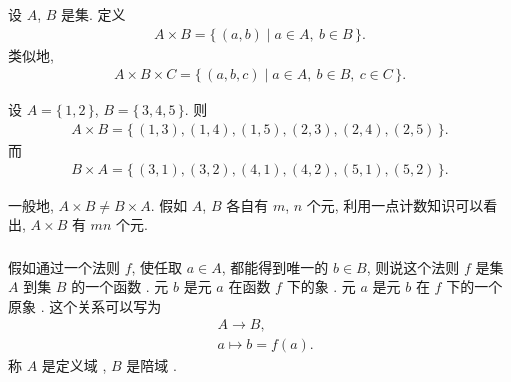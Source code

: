 \begin{definition}
    设 $A$, $B$ 是集. 定义
    \begin{align*}
        A \times B = \{\, (a,b) \mid a \in A, \ b \in B  \,\}.
    \end{align*}
    类似地,
    \begin{align*}
        A \times B \times C = \{\, (a,b,c) \mid a \in A, \ b \in B, \ c \in C  \,\}.
    \end{align*}
\end{definition}

\begin{example}
    设 $A = \{\, 1,2 \,\}$, $B = \{\, 3,4,5 \,\}$. 则
    \begin{align*}
        A \times B = \{\, (1,3),(1,4),(1,5),(2,3),(2,4),(2,5) \,\}.
    \end{align*}
    而
    \begin{align*}
        B \times A = \{\, (3,1),(3,2),(4,1),(4,2),(5,1),(5,2) \,\}.
    \end{align*}
\end{example}

\begin{remark}
    一般地, $A \times B \neq B \times A$. 假如 $A$, $B$ 各自有 $m$, $n$ 个元, 利用一点计数知识可以看出, $A \times B$ 有 $mn$ 个元.
\end{remark}

\subsubsection*{\Functions}

\begin{definition}
    假如通过一个法则 $f$, 使任取 $a \in A$, 都能得到唯一的 $b \in B$, 则说这个法则 $f$ 是集 $A$ 到集 $B$ 的一个函数 . 元 $b$ 是元 $a$ 在函数 $f$ 下的象 . 元 $a$ 是元 $b$ 在 $f$ 下的一个原象 . 这个关系可以写为
    \begin{align*}
         & A \to B,  \tag*{$f$:} \\
         & a \mapsto b = f(a).
    \end{align*}
    称 $A$ 是定义域 , $B$ 是陪域 .
\end{definition}

